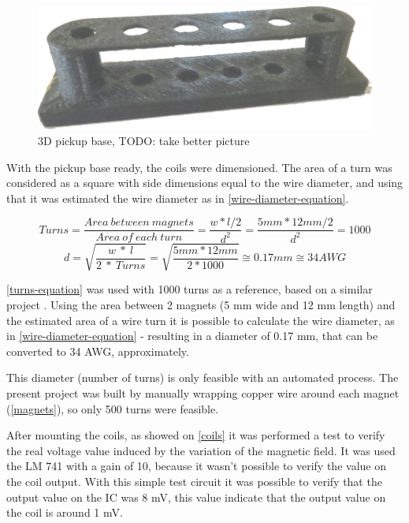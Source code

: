 \begin{figure}[!htpb]
\centering
\caption{3D pickup base, TODO: take better picture}
\label{3D-base}
\includegraphics[scale=0.08]{images/base}
\end{figure}

With the pickup base ready, the coils were dimensioned. The area of a turn
was considered as a square with side dimensions equal to the wire diameter, and using that
it was estimated the wire diameter as in \autoref{wire-diameter-equation}.

\begin{equation}
  \label{turns-equation}
  Turns = \frac{Area\ between\ magnets}{Area\ of\ each\ turn} = \frac{ w * l / 2 }{ d^{2} } = \frac{5 mm * 12 mm / 2}{d^2} = 1000
\end{equation}
\begin{equation}
  \label{wire-diameter-equation}
  d = \sqrt{\frac{w\ *\ l}{2\ *\ Turns}} = \sqrt{\frac{5 mm * 12 mm}{2*1000}} \cong 0.17 mm \cong 34 AWG
\end{equation}

\autoref{turns-equation} was used with 1000 turns as a reference, based on a similar project
\cite{hexaphonic-pickup}. Using the area between 2 magnets (5 mm wide
and 12 mm length) and the estimated area of a wire turn it is possible to calculate the wire diameter,
as in \autoref{wire-diameter-equation} - resulting in a diameter of 0.17 mm, that can be
converted to 34 AWG, approximately. 

This diameter (number of turns) is only feasible with an automated process. The present project was built by manually
wrapping copper wire around each magnet (\autoref{magnets}), so only 500 turns were feasible. 

After mounting the coils, as showed on \autoref{coils} it was performed a test to verify the real voltage value induced by
the variation of the magnetic field. It was used the LM 741 \cite{LM741} with a gain of 10,
because it wasn't possible to verify the value on the coil output. With this simple test circuit
it was possible to verify that the output value on the IC was 8 mV, this value indicate that the
output value on the coil is around 1 mV.

